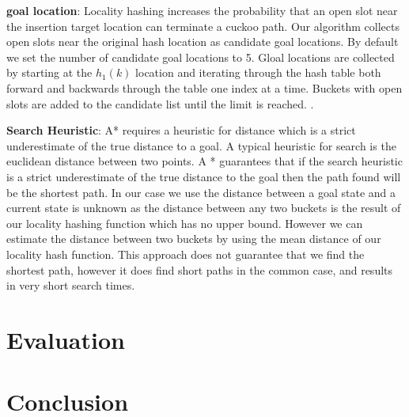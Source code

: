 \textbf{goal location}: Locality hashing increases the
probability that an open slot near the insertion target
location can terminate a cuckoo path. Our algorithm collects
open slots near the original hash location as candidate goal
locations. By default we set the number of candidate goal
locations to 5. Gloal locations are collected by starting at
the $h_1(k)$ location and iterating through the hash
table both forward and backwards through the table one index
at a time. Buckets with open slots are added to the
candidate list until the limit is reached. .

\textbf{Search Heuristic}: A* requires a heuristic for
distance which is a strict underestimate of the true
distance to a goal. A typical heuristic for search is the
euclidean distance between two points. A * guarantees that
if the search heuristic is a strict underestimate of the
true distance to the goal then the path found will be the
shortest path. In our case we use the distance between a
goal state and a current state is unknown as the distance
between any two buckets is the result of our locality
hashing function which has no upper bound. However we can
estimate the distance between two buckets by using the mean
distance of our locality hash function. This approach does
not guarantee that we find the shortest path, however it
does find short paths in the common case, and results in
very short search times.


\section{Evaluation}
\label{sec:eval}

\section{Conclusion}
\label{sec:conclusion}
